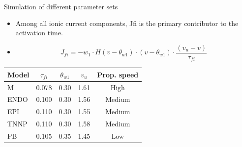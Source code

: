 \documentclass{beamer}
\begin{document}
\begin{frame}{Simulation of different parameter sets}
\begin{itemize}
    \item 
Among all ionic current components, Jfi
    is the primary contributor to the activation time.
    \item
    \[
J_{fi} = -w_1\cdot H(v-\theta_{w1})\cdot(v-\theta_{w1})\cdot\frac{(v_u-v)}{\tau_{fi}}
\]
\end{itemize}
\begin{table}[h]
\centering
\begin{tabular}{lcccc}
\hline
\textbf{Model} & \boldmath$\tau_{fi}$ & \boldmath$\theta_{w1}$ & \boldmath$v_u$ & \textbf{Prop. speed}  \\
\hline
M    & 0.078 & 0.30 & 1.61 & High \\
ENDO & 0.100 & 0.30 & 1.56 & Medium \\
EPI  & 0.110 & 0.30 & 1.55 & Medium \\
TNNP & 0.110 & 0.30 & 1.58 & Medium \\
PB   & 0.105 & 0.35 & 1.45 & Low \\
\hline
\end{tabular}
\end{table}

\end{frame}
     
\end{document}
